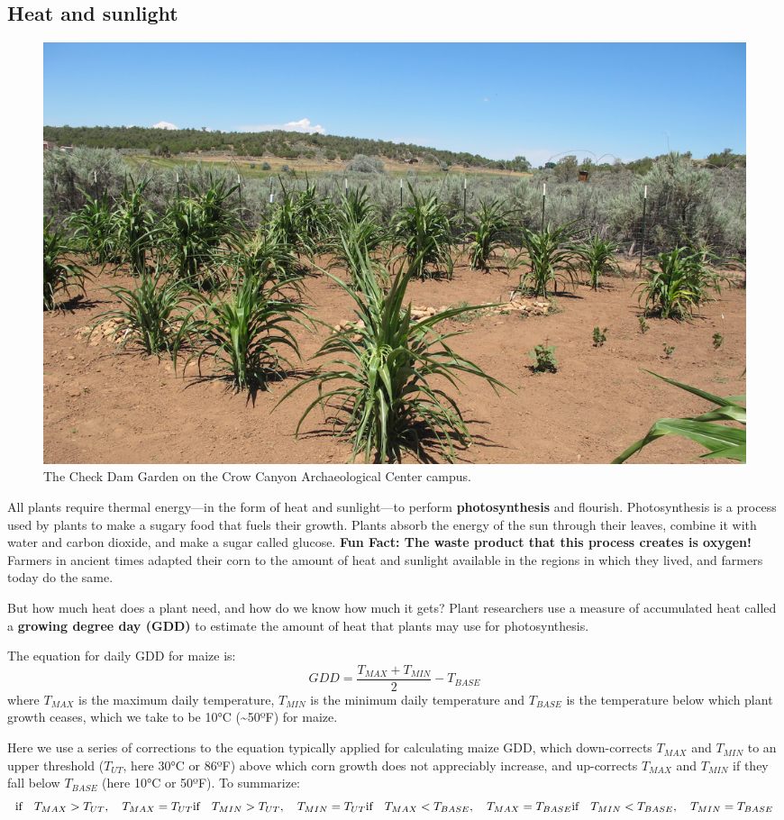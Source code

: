 \documentclass[12pt,]{article}
\begin{document}
\hypertarget{heat-and-sunlight}{%
\subsection{Heat and sunlight}\label{heat-and-sunlight}}

\begin{figure}
\centering
\includegraphics{./images/section_4.3_header.jpg}
\caption{The Check Dam Garden on the Crow Canyon Archaeological Center campus.}
\end{figure}

All plants require thermal energy---in the form of heat and sunlight---to perform \textbf{photosynthesis} and flourish. Photosynthesis is a process used by plants to make a sugary food that fuels their growth. Plants absorb the energy of the sun through their leaves, combine it with water and carbon dioxide, and make a sugar called glucose. \textbf{Fun Fact: The waste product that this process creates is oxygen!} Farmers in ancient times adapted their corn to the amount of heat and sunlight available in the regions in which they lived, and farmers today do the same.

But how much heat does a plant need, and how do we know how much it gets? Plant researchers use a measure of accumulated heat called a \textbf{growing degree day (GDD)} to estimate the amount of heat that plants may use for photosynthesis.

The equation for daily GDD for maize is:
\[ GDD=\frac{T_{MAX} + T_{MIN}}{2}-T_{BASE} \]
where \(T_{MAX}\) is the maximum daily temperature, \(T_{MIN}\) is the minimum daily temperature and \(T_{BASE}\) is the temperature below which plant growth ceases, which we take to be 10°C (\textasciitilde50ºF) for maize.

Here we use a series of corrections to the equation typically applied for calculating maize GDD, which down-corrects \(T_{MAX}\) and \(T_{MIN}\) to an upper threshold (\(T_{UT}\), here 30°C or 86ºF) above which corn growth does not appreciably increase, and up-corrects \(T_{MAX}\) and \(T_{MIN}\) if they fall below \(T_{BASE}\) (here 10°C or 50ºF). To summarize:
\[
\text{if} \quad T_{MAX}>T_{UT}, \quad T_{MAX}=T_{UT}\\
\text{if} \quad T_{MIN}>T_{UT}, \quad T_{MIN}=T_{UT}\\
\text{if} \quad T_{MAX}<T_{BASE}, \quad T_{MAX}=T_{BASE}\\
\text{if} \quad T_{MIN}<T_{BASE}, \quad T_{MIN}=T_{BASE}
\]
\end{document}
